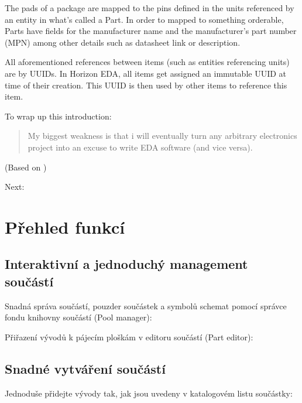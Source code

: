 \documentclass[letterpaper,10pt,czech]{sphinxmanual}
\begin{document}
The pads of a package are mapped to the pins defined in the units
referenced by an entity in what’s called a Part. In order to mapped to
something orderable, Parts have fields for the manufacturer name and
the manufacturer’s part number (MPN) among other details such as
datasheet link or description.

All aforementioned references between items (such as entities
referencing units) are by UUIDs. In Horizon EDA, all items get assigned
an immutable UUID at time of their creation. This UUID is then used by
other items to reference this item.

To wrap up this introduction:
\begin{quote}

My biggest weakness is that i will eventually turn any arbitrary
electronics project into an excuse to write EDA software (and vice
versa).
\end{quote}

(Based on )

Next: {\hyperref[\detokenize{feature-overview::doc}]{}}


\chapter{Přehled funkcí}
\label{\detokenize{feature-overview:prehled-funkci}}\label{\detokenize{feature-overview::doc}}

\section{Interaktivní a jednoduchý management součástí}
\label{\detokenize{feature-overview:interaktivni-a-jednoduchy-management-soucasti}}
Snadná správa součástí, pouzder součástek a symbolů schemat pomocí správce fondu knihovny součástí (Pool manager):

\noindent{}

Přiřazení vývodů k pájecím ploškám v editoru součástí (Part editor):

\noindent{}


\section{Snadné vytváření součástí}
\label{\detokenize{feature-overview:snadne-vytvareni-soucasti}}
Jednoduše přidejte vývody tak, jak jsou uvedeny v katalogovém listu součástky:
\end{document}
